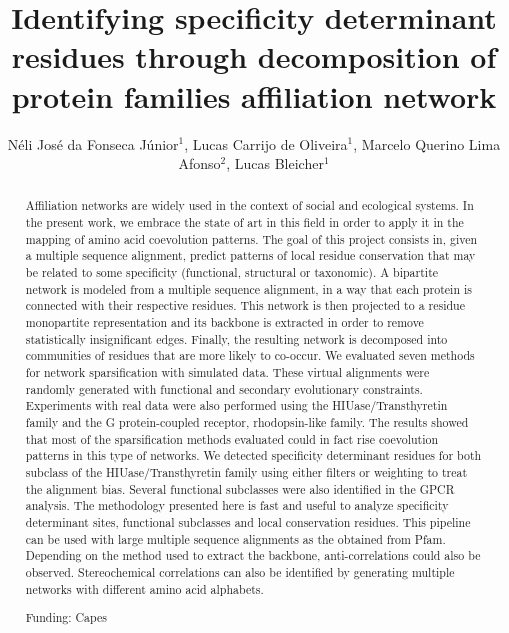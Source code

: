 \documentclass[twoside]{article}
\title{\vspace{-15mm}\fontsize{24pt}{10pt}\selectfont\textbf{Identifying specificity determinant residues through decomposition of protein families affiliation network}} %
\author{N\'eli Jos\'e da Fonseca J\'unior$^1$, Lucas Carrijo de Oliveira$^1$, Marcelo Querino Lima Afonso$^2$, Lucas Bleicher$^1$}
\affil{1 UFMG\\ }
\date{}
\begin{document}
\maketitle %

\thispagestyle{fancy} %


\begin{abstract}
Affiliation networks are widely used in the context of social and ecological systems. In the present work, we embrace the state of art in this field in order to apply it in the mapping of amino acid coevolution patterns. The goal of this project consists in, given a multiple sequence alignment, predict patterns of local residue conservation that may be related to some specificity (functional, structural or taxonomic). A bipartite network is modeled from a multiple sequence alignment, in a way that each protein is connected with their respective residues. This network is then projected to a residue monopartite representation and its backbone is extracted in order to remove statistically insignificant edges. Finally, the resulting network is decomposed into communities of residues that are more likely to co-occur. We evaluated seven methods for network sparsification with simulated data. These virtual alignments were randomly generated with functional and secondary evolutionary constraints. Experiments with real data were also performed using the  HIUase/Transthyretin family and the G protein-coupled receptor, rhodopsin-like family. The results showed that most of the sparsification methods evaluated could in fact rise coevolution patterns in this type of networks. We detected specificity determinant residues for both subclass of the HIUase/Transthyretin family using either filters or weighting to treat the alignment bias. Several functional subclasses were also identified in the GPCR analysis. The methodology presented here is fast and useful to analyze specificity determinant sites, functional subclasses and local conservation residues. This pipeline can be used with large multiple sequence alignments as the obtained from Pfam. Depending on the method used to extract the backbone, anti-correlations could also be observed. Stereochemical correlations can also be identified by generating multiple networks with different amino acid alphabets.

Funding: Capes
\end{abstract}
\end{document}
